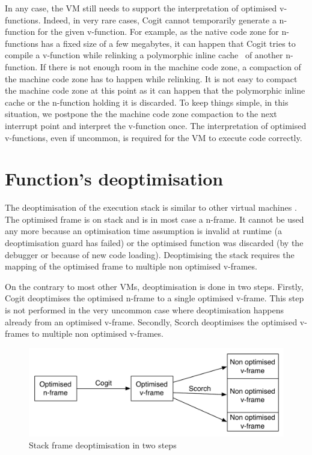 \documentclass[a4paper,12pt,twoside]{../includes/ThesisStyle}
\begin{document}
In any case, the VM still needs to support the interpretation of optimised v-functions. Indeed, in very rare cases, Cogit cannot temporarily generate a n-function for the given v-function. For example, as the native code zone for n-functions has a fixed size of a few megabytes, it can happen that Cogit tries to compile a v-function while relinking a polymorphic inline cache~\cite{Holz91a} of another n-function. If there is not enough room in the machine code zone, a compaction of the machine code zone has to happen while relinking. It is not easy to compact the machine code zone at this point as it can happen that the polymorphic inline cache or the n-function holding it is discarded. To keep things simple, in this situation, we postpone the the machine code zone compaction to the next interrupt point and interpret the v-function once. The interpretation of optimised v-functions, even if uncommon, is required for the VM to execute code correctly.  


\section {Function's deoptimisation}

The deoptimisation of the execution stack is similar to other virtual machines \cite{Fin03a, Holz92a}. The optimised frame is on stack and is in most case a n-frame. It cannot be used any more because an optimisation time assumption is invalid at runtime (a deoptimisation guard has failed) or the optimised function was discarded (by the debugger or because of new code loading). Deoptimising the stack requires the mapping of the optimised frame to multiple non optimised v-frames. 

On the contrary to most other VMs, deoptimisation is done in two steps. Firstly, Cogit deoptimises the optimised n-frame to a single optimised v-frame. This step is not performed in the very uncommon case where deoptimisation happens already from an optimised v-frame. Secondly, Scorch deoptimises the optimised v-frames to multiple non optimised v-frames.

\begin{figure}[h!]
    \begin{center}
        \includegraphics[width=0.8\linewidth]{SFDeoptimisation}
        \caption{Stack frame deoptimisation in two steps}
        \label{fig:SFDeoptimisation}
    \end{center}
\end{figure}
\end{document}
